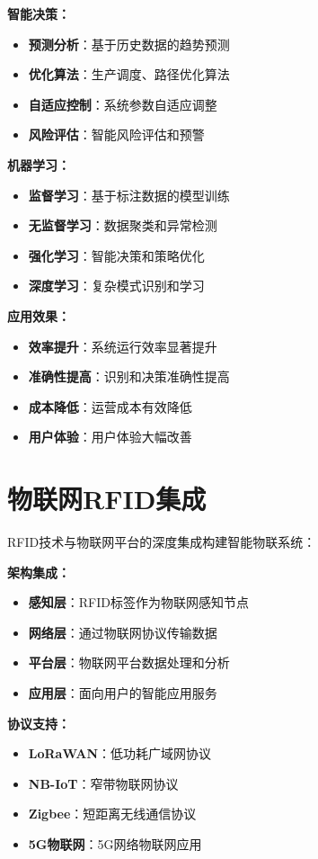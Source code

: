 \documentclass[12pt,UTF8]{ctexbook}
\begin{document}
\begin{itemize}[leftmargin=3.5em]
\begin{itemize}[leftmargin=3.5em]
\begin{itemize}[leftmargin=3.5em]
\begin{itemize}[leftmargin=3.5em]
\textbf{智能决策：}
\begin{itemize}[leftmargin=3.5em]
    \item \textbf{预测分析}：基于历史数据的趋势预测
    \item \textbf{优化算法}：生产调度、路径优化算法
    \item \textbf{自适应控制}：系统参数自适应调整
    \item \textbf{风险评估}：智能风险评估和预警
\end{itemize}

\textbf{机器学习：}
\begin{itemize}[leftmargin=3.5em]
    \item \textbf{监督学习}：基于标注数据的模型训练
    \item \textbf{无监督学习}：数据聚类和异常检测
    \item \textbf{强化学习}：智能决策和策略优化
    \item \textbf{深度学习}：复杂模式识别和学习
\end{itemize}

\textbf{应用效果：}
\begin{itemize}[leftmargin=3.5em]
    \item \textbf{效率提升}：系统运行效率显著提升
    \item \textbf{准确性提高}：识别和决策准确性提高
    \item \textbf{成本降低}：运营成本有效降低
    \item \textbf{用户体验}：用户体验大幅改善
\end{itemize}

\section{物联网RFID集成}

RFID技术与物联网平台的深度集成构建智能物联系统：

\textbf{架构集成：}
\begin{itemize}[leftmargin=3.5em]
    \item \textbf{感知层}：RFID标签作为物联网感知节点
    \item \textbf{网络层}：通过物联网协议传输数据
    \item \textbf{平台层}：物联网平台数据处理和分析
    \item \textbf{应用层}：面向用户的智能应用服务
\end{itemize}

\textbf{协议支持：}
\begin{itemize}[leftmargin=3.5em]
    \item \textbf{LoRaWAN}：低功耗广域网协议
    \item \textbf{NB-IoT}：窄带物联网协议
    \item \textbf{Zigbee}：短距离无线通信协议
    \item \textbf{5G物联网}：5G网络物联网应用
\end{itemize}


\end{itemize}
\end{itemize}
\end{itemize}
\end{itemize}
\end{document}

